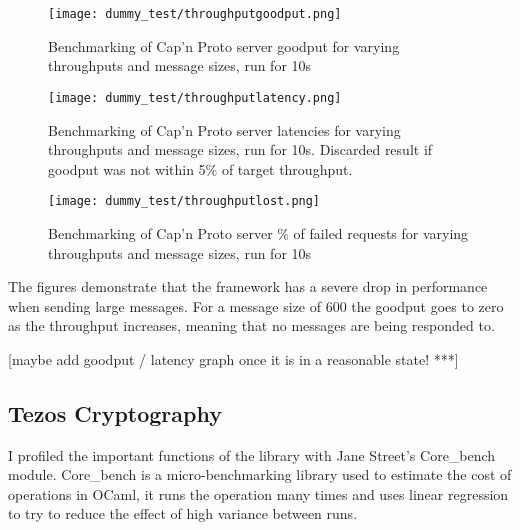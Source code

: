 \begin{figure}[h!]
\centering
\texttt{[image: dummy\_test/throughputgoodput.png]}
\caption{Benchmarking of Cap'n Proto server goodput for varying throughputs and message sizes, run for 10s}
\end{figure}

\begin{figure}[h!]
\centering
\texttt{[image: dummy\_test/throughputlatency.png]}
\caption{Benchmarking of Cap'n Proto server latencies for varying throughputs and message sizes, run for 10s. Discarded result if goodput was not within 5\% of target throughput.}
\end{figure}

\begin{figure}[h!]
\centering
\texttt{[image: dummy\_test/throughputlost.png]}
\caption{Benchmarking of Cap'n Proto server \% of failed requests for varying throughputs and message sizes, run for 10s}
\end{figure}

The figures demonstrate that the framework has a severe drop in performance when sending large messages. For a message size of 600 the goodput goes to zero as the throughput increases, meaning that no messages are being responded to.

[maybe add goodput / latency graph once it is in a reasonable state! ***]

\subsection{Tezos Cryptography} \label{tezosbenchmark}
I profiled the important functions of the library with Jane Street's Core\_bench module. Core\_bench is a micro-benchmarking library used to estimate the cost of operations in OCaml, it runs the operation many times and uses linear regression to try to reduce the effect of high variance between runs.


